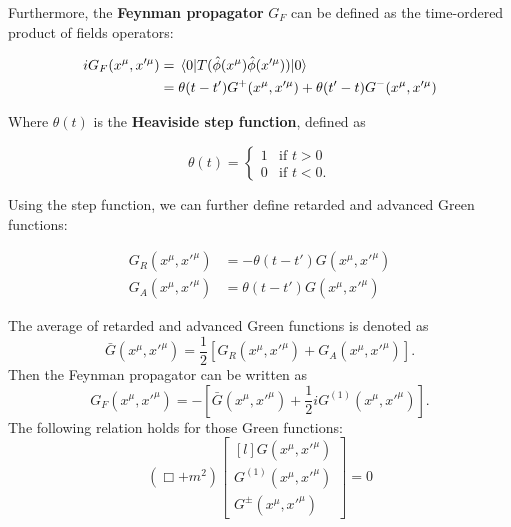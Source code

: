 \documentclass[12pt]{article}
\numberwithin{equation}{subsection}
\theoremstyle{mystyle}{\newtheorem{definition}{Definition}[subsection]}
\theoremstyle{mystyle}{\newtheorem{theorem}[definition]{Theorem}}
\theoremstyle{mystyle}{\newtheorem*{remark}{Remark}}
\theoremstyle{mystyle}{\newtheorem{example}{Example}[subsection]}
\theoremstyle{mystyle}{\newtheorem{examples}{Examples}[subsection]}
\theoremstyle{mystyle}{\newtheorem{cthm}{}[subsection]}
\newcommand{\tbf}[1]{\textbf{#1}}
\begin{document}
Furthermore, the \tbf{Feynman propagator} \(G_{F}\) can be defined as the time-ordered product of fields operators:
\begin{cthm}
  \begin{align*}
    iG_{F}(x^{\mu},x'^{\mu}) & =\expval{T(\hat{\phi}(x^{\mu})\hat{\phi}(x'^{\mu}))}{0}              \\
                             & =\theta(t-t')G^+(x^{\mu},x'^{\mu})+\theta(t'-t)G^-(x^{\mu},x'^{\mu})
  \end{align*}
\end{cthm}
Where \(\theta(t)\) is the \tbf{Heaviside step function}, defined as
\begin{definition}
  \begin{equation*}
    \theta(t)=
    \begin{cases}
      1 & \text{if \(t>0\)}  \\
      0 & \text{if \(t<0\)}.
    \end{cases}
  \end{equation*}
\end{definition}
Using the step function, we can further define retarded and advanced Green functions:
\begin{cthm}
  \begin{align*}
    G_{R}(x^{\mu},x'^{\mu}) & =-\theta(t-t')G(x^{\mu},x'^{\mu}) \\
    G_{A}(x^{\mu},x'^{\mu}) & =\theta(t-t')G(x^{\mu},x'^{\mu})
  \end{align*}
\end{cthm}
The average of retarded and advanced Green functions is denoted as
\begin{equation}
  \bar{G}(x^{\mu},x'^{\mu})=\frac{1}{2}\left[G_{R}(x^{\mu},x'^{\mu})+G_{A}(x^{\mu},x'^{\mu})\right].
\end{equation}
Then the Feynman propagator can be written as
\begin{equation}
  G_{F}(x^{\mu},x'^{\mu})=-\left[\bar{G}(x^{\mu},x'^{\mu})+\frac{1}{2}iG^{(1)}(x^{\mu},x'^{\mu})\right].
\end{equation}
The following relation holds for those Green functions:
\begin{equation}
  (\Box+m^2)
  \begin{bmatrix*}[l]
    G(x^{\mu},x'^{\mu})\\
    G^{(1)}(x^{\mu},x'^{\mu})\\
    G^{\pm}(x^{\mu},x'^{\mu})
  \end{bmatrix*}
  =0
\end{equation}
\end{document}
